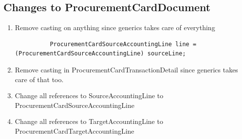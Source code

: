 \documentclass[12pt,notitlepage]{article}
\begin{document}
  \subsection{Changes to ProcurementCardDocument}
    \begin{enumerate}
      \item Remove casting on anything since generics takes care of everything
        \begin{lstlisting}
          ProcurementCardSourceAccountingLine line = (ProcurementCardSourceAccountingLine) sourceLine;
        \end{lstlisting}

      \item Remove casting in ProcurementCardTransactionDetail since generics takes care of that too.
      \item Change all references to SourceAccountingLine to ProcurementCardSourceAccountingLine
      
      
      \item Change all references to TargetAccountingLine to ProcurementCardTargetAccountingLine
      
      
   \end{enumerate}
\end{document}
